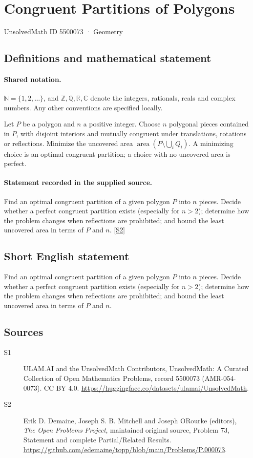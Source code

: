 \documentclass[11pt]{article}
\newcommand{\sref}[2]{\hyperlink{source:#1:#2}{[S#2]}}
\begin{document}
\setcounter{section}{5500072}
\section{Congruent Partitions of Polygons}\label{5500073}
{\small\sffamily UnsolvedMath ID 5500073 · Geometry}
\subsection{Definitions and mathematical statement}

\paragraph{Shared notation.}$\mathbb N=\{1,2,\ldots\}$, and $\mathbb Z,\mathbb Q,\mathbb R,\mathbb C$ denote the integers, rationals, reals and complex numbers. Any other conventions are specified locally.


Let $P$ be a polygon and $n$ a positive integer. Choose $n$ polygonal pieces contained in $P$, with disjoint interiors and mutually congruent under translations, rotations or reflections. Minimize the uncovered area $\operatorname{area}(P\setminus\bigcup_i Q_i)$. A minimizing choice is an optimal congruent partition; a choice with no uncovered area is perfect.
\paragraph{Statement recorded in the supplied source.}
Find an optimal congruent partition of a given polygon $P$ into $n$ pieces. Decide whether a perfect congruent partition exists (especially for $n>2$); determine how the problem changes when reflections are prohibited; and bound the least uncovered area in terms of $P$ and $n$. \sref{5500073}{2}
\subsection{Short English statement}
Find an optimal congruent partition of a given polygon $P$ into $n$ pieces. Decide whether a perfect congruent partition exists (especially for $n>2$); determine how the problem changes when reflections are prohibited; and bound the least uncovered area in terms of $P$ and $n$.
\subsection{Sources}
\begin{description}
\item[\hypertarget{source:5500073:1}{S1}] ULAM.AI and the UnsolvedMath Contributors, UnsolvedMath: A Curated Collection of Open Mathematics Problems, record 5500073 (AMR-054-0073). CC BY 4.0. \url{https://huggingface.co/datasets/ulamai/UnsolvedMath}.
\item[\hypertarget{source:5500073:2}{S2}] Erik D. Demaine, Joseph S. B. Mitchell and Joseph O\textquotesingle Rourke (editors), \emph{The Open Problems Project}, maintained original source, Problem 73, Statement and complete Partial/Related Results. \url{https://github.com/edemaine/topp/blob/main/Problems/P.000073}.
\end{description}
\label{end:5500073}
\end{document}
